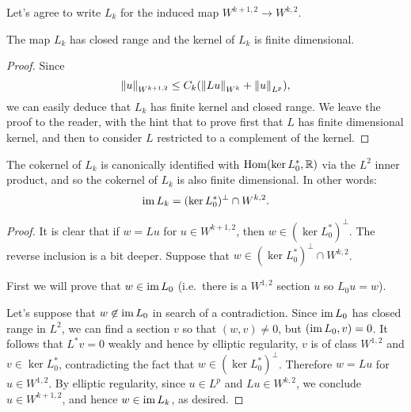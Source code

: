  Let's agree to write $L_{k}$ for the induced map $W^{k+1,2}\to
   W^{k,2}$.
 \begin{lemma}
   The map $L_{k}$ has closed range and the kernel of $L_{k}$ is finite dimensional.
 \end{lemma}
 \begin{proof}
   Since
   \begin{equation*}
     \left\lVert u\right\rVert_{W^{k+1,2}}\le C_{k}(\left\lVert Lu\right\rVert_{W^{k}}+\left\lVert u\right\rVert_{L^{p}}),
   \end{equation*}
   we can easily deduce that $L_{k}$ has finite kernel and closed
   range. We leave the proof to the reader, with the hint that to
   prove first that $L$ has finite dimensional kernel, and then to
   consider $L$ restricted to a complement of the kernel.
 \end{proof}
 
 \begin{lemma}
   The cokernel of $L_{k}$ is
   canonically identified with $\operatorname{\mathrm{Hom}}(\ker L^{*}_{0},\mathbb{R})$ via the $L^{2}$
   inner product, and so the cokernel of $L_{k}$ is also finite
   dimensional. In other words:
   \begin{equation*}
     \operatorname{\mathrm{im}} L_{k}=(\ker L^{*}_{0})^{\perp}\cap W^{k,2}.
   \end{equation*}
 \end{lemma}
 \begin{proof}
   It is clear that if $w=Lu$ for $u\in W^{k+1,2}$, then $w\in (\ker
   L^{*}_{0})^{\perp}$. The reverse inclusion is a bit deeper. Suppose
   that $w\in (\ker L^{*}_{0})^{\perp}\cap W^{k,2}$.

   First we will prove that $w\in \operatorname{\mathrm{im}} L_{0}$ (i.e.\ there is a
   $W^{1,2}$ section $u$ so $L_{0}u=w$). 

   Let's suppose that $w\not\in \operatorname{\mathrm{im}} L_{0}$ in search of a
   contradiction. Since $\operatorname{\mathrm{im}} L_{0}$ has closed range in $L^{2}$, we
   can find a section $v$ so that $(w,v)\ne 0$, but $(\operatorname{\mathrm{im}}
   L_{0},v)=0$. It follows that $L^{*}v=0$ weakly and hence by
   elliptic regularity, $v$ is of class $W^{1,2}$ and
   $v\in \ker L^{*}_{0}$, contradicting the fact that $w\in (\ker
   L_{0}^{*})^{\perp}$. Therefore $w=Lu$ for $u\in W^{1,2}$. By
   elliptic regularity, since $u\in L^{p}$ and $Lu\in W^{k,2}$, we
   conclude $u\in W^{k+1,2}$, and hence $w\in \operatorname{\mathrm{im}} L_{k}$, as desired.   
 \end{proof}
 
